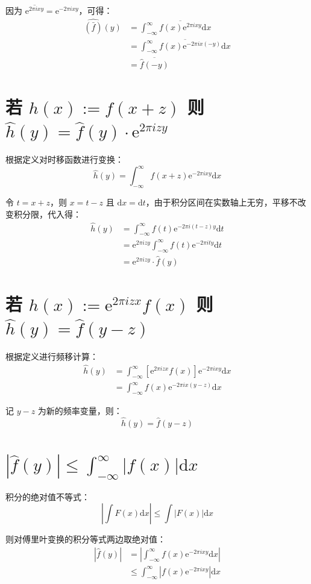 \documentclass{article}
\newcommand{\e}{\mathrm{e}}
\renewcommand{\d}{\mathrm{d}}
\begin{document}
因为 $\overline{\e^{2\pi i xy}} = \e^{-2\pi i xy}$，可得：
\begin{align*}
    \widehat{(\bar{f})}(y) &= \int_{-\infty}^{\infty} \overline{f(x)\e^{2\pi i xy}} \d x
    \\
    &= \overline{\int_{-\infty}^{\infty} f(x)\e^{-2\pi i x(-y)} \d x}
    \\
    &= \overline{\hat{f}(-y)}
\end{align*}



\section{若 $h(x) := f(x+z)$ 则 $\hat{h}(y) = \hat{f}(y) \cdot \e^{2\pi izy}$}
根据定义对时移函数进行变换：
\[ \hat{h}(y) = \int_{-\infty}^{\infty} f(x+z)\e^{-2\pi i xy} \d x \]

令 $t = x+z$，则 $x = t-z$ 且 $\d x = \d t$，由于积分区间在实数轴上无穷，平移不改变积分限，代入得：
\begin{align*}
    \hat{h}(y) &= \int_{-\infty}^{\infty} f(t)\e^{-2\pi i (t-z)y} \d t
    \\
    &= \e^{2\pi i zy} \int_{-\infty}^{\infty} f(t)\e^{-2\pi i ty} \d t
    \\
    &= \e^{2\pi i zy} \cdot \hat{f}(y)
\end{align*}



\section{若 $h(x) := \e^{2\pi izx}f(x)$ 则 $\hat{h}(y) = \hat{f}(y - z)$}
根据定义进行频移计算：
\begin{align*}
    \hat{h}(y) &= \int_{-\infty}^{\infty} \left[ \e^{2\pi i zx}f(x) \right] \e^{-2\pi i xy} \d x
    \\
    &= \int_{-\infty}^{\infty} f(x)\e^{-2\pi i x(y-z)} \d x
\end{align*}

记 $y-z$ 为新的频率变量，则：
\[ \hat{h}(y) = \hat{f}(y-z) \]



\section{$|\hat{f}(y)| \leqslant \displaystyle\int_{-\infty}^{\infty} |f(x)|\d x$}
积分的绝对值不等式：
\[ \left|\int F(x)\d x\right| \leqslant \int |F(x)|\d x \]

则对傅里叶变换的积分等式两边取绝对值：
\begin{align*}
    |\hat{f}(y)| &= \left| \int_{-\infty}^{\infty} f(x)\e^{-2\pi i xy} \d x \right|
    \\
    &\leqslant \int_{-\infty}^{\infty} \left| f(x)\e^{-2\pi i xy} \right| \d x
\end{align*}
\end{document}
